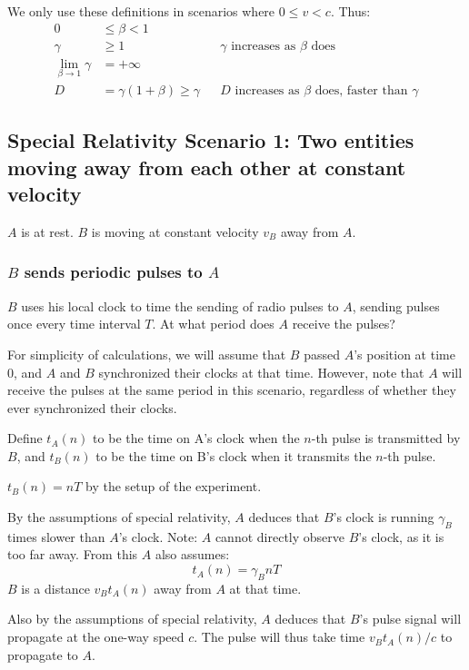 \documentclass[a4paper]{article}
\theoremstyle{plain}
\theoremstyle{definition}
\begin{document}
We only use these definitions in scenarios where $0 \leq v < c$.
Thus:
\begin{align*}
0 & \leq \beta < 1 \\
\gamma & \geq 1 & & \text{$\gamma$ increases as $\beta$ does} \\
\lim_{\beta \rightarrow 1} \gamma & = +\infty \\
D & = \gamma (1+\beta) \geq \gamma & & \text{$D$ increases as $\beta$ does, faster than $\gamma$}
\end{align*}


\subsection{Special Relativity Scenario 1: Two entities moving away from each other at constant velocity}
\label{sec:scen1}

$A$ is at rest.  $B$ is moving at constant velocity $v_B$ away from $A$.


\subsubsection{$B$ sends periodic pulses to $A$}
\label{sec:scen1BtoA}

$B$ uses his local clock to time the sending of radio pulses to $A$,
sending pulses once every time interval $T$.
At what period does $A$ receive the pulses?

For simplicity of calculations, we will assume that $B$ passed $A$'s
position at time 0, and $A$ and $B$ synchronized their clocks at that
time.  However, note that $A$ will receive the pulses at the same
period in this scenario, regardless of whether they ever synchronized
their clocks.

Define $t_A(n)$ to be the time on A's clock when the $n$-th pulse is
transmitted by $B$, and $t_B(n)$ to be the time on B's clock when it
transmits the $n$-th pulse.

$t_B(n) = nT$ by the setup of the experiment.

By the assumptions of special relativity, $A$ deduces that $B$'s clock
is running $\gamma_B$ times slower than $A$'s clock.  Note: $A$ cannot
directly observe $B$'s clock, as it is too far away.  From this $A$
also assumes:
\begin{equation}
  t_A(n) = \gamma_B nT  \label{eqn:scen1timeA}
\end{equation}
$B$ is a distance $v_B t_A(n)$ away from $A$ at that time.

Also by the assumptions of special relativity, $A$ deduces that $B$'s
pulse signal will propagate at the one-way speed $c$.  The pulse will
thus take time $v_B t_A(n)/c$ to propagate to $A$.
\end{document}
